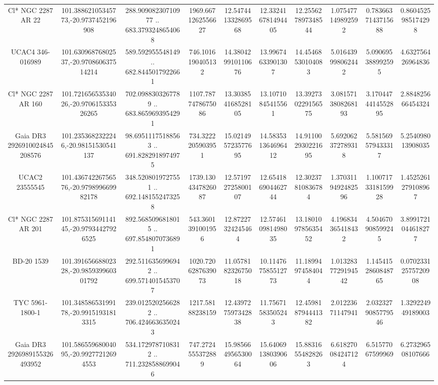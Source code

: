 \begin{table}
\begin{tabular}{cccccccccc}
Cl* NGC 2287     AR      22 & 101.38862105345773,-20.9737452196908 & 288.90908230710977 .. 683.3793248654068 & 1969.6671262556627 & 12.547441332869568 & 12.332416781494405 & 12.255627897348544 & 1.075477149892592 & 0.7836637143715688 & 0.8604525985174298 \\
UCAC4 346-016989 & 101.63096876802537,-20.970860637514214 & 589.592955548149 .. 682.8445017922661 & 746.1016190405132 & 14.380429910110676 & 13.99674633901307 & 14.45468530104083 & 5.016439998062442 & 5.090695388992595 & 4.632756426964836 \\
Cl* NGC 2287     AR     160 & 101.72165653534026,-20.970615335326265 & 702.0988303267789 .. 683.8659693954291 & 1107.7877478675086 & 13.303854168528105 & 13.10710845415561 & 13.392730229156575 & 3.0815713808268193 & 3.1704474414552895 & 2.884825666454324 \\
Gaia DR3 2926910024845208576 & 101.2353682322246,-20.98151530541137 & 98.69511175188563 .. 691.8282918974975 & 734.3222205903951 & 15.021495723577695 & 14.583531364696412 & 14.911002930221695 & 5.692062372789318 & 5.581569579433317 & 5.254098013908035 \\
UCAC2  23555545 & 101.43674226756576,-20.979899669982178 & 348.5208019727551 .. 692.1481552473258 & 1739.1304347826087 & 12.571972725800107 & 12.654186904462744 & 12.30237810836784 & 1.3703119492482596 & 1.1007173318159928 & 1.4525261279108967 \\
Cl* NGC 2287     AR     201 & 101.87531569114145,-20.97934427926525 & 892.5685096818015 .. 697.8548070736891 & 543.3601391001956 & 12.87227324245464 & 12.574610981498035 & 13.180109785635452 & 4.196834365418432 & 4.504670908599245 & 3.8991721044618277 \\
BD-20  1539 & 101.39165668802328,-20.985939960301792 & 292.5116356996942 .. 699.5714015453707 & 1020.7206287639073 & 11.057818232675018 & 10.114767585512773 & 11.18994974584044 & 1.0132837729194542 & 1.1454152860848765 & 0.07023312575720908 \\
TYC 5961-1800-1 & 101.34858653199178,-20.99151931813315 & 239.0125202566282 .. 706.4246636350243 & 1217.58188238159 & 12.439727597342838 & 11.75671583505243 & 12.459818794441382 & 2.01223671147941 & 2.0323279085779546 & 1.329224949189003 \\
Gaia DR3 2926989155326493952 & 101.58655968004095,-20.99277212694553 & 534.1729787108312 .. 711.2328588699046 & 747.2724555372889 & 15.985664956530064 & 15.640691380390606 & 15.88316554828263 & 6.618270084247124 & 6.51577067599969 & 6.273296508107666 \\

\end{tabular}
\end{table}
